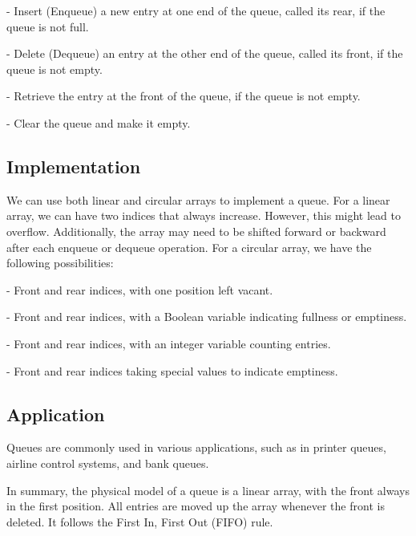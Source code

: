 - Insert (Enqueue) a new entry at one end of the queue, called its rear, if the queue is not full.

- Delete (Dequeue) an entry at the other end of the queue, called its front, if the queue is not empty.

- Retrieve the entry at the front of the queue, if the queue is not empty.

- Clear the queue and make it empty.

\subsection{Implementation}
We can use both linear and circular arrays to implement a queue. For a linear array, we can have two indices that always increase. However, this might lead to overflow. Additionally, the array may need to be shifted forward or backward after each enqueue or dequeue operation. For a circular array, we have the following possibilities:

- Front and rear indices, with one position left vacant.

- Front and rear indices, with a Boolean variable indicating fullness or emptiness.

- Front and rear indices, with an integer variable counting entries.

- Front and rear indices taking special values to indicate emptiness.

\subsection{Application}
Queues are commonly used in various applications, such as in printer queues, airline control systems, and bank queues.

In summary, the physical model of a queue is a linear array, with the front always in the first position. All entries are moved up the array whenever the front is deleted. It follows the First In, First Out (FIFO) rule.
